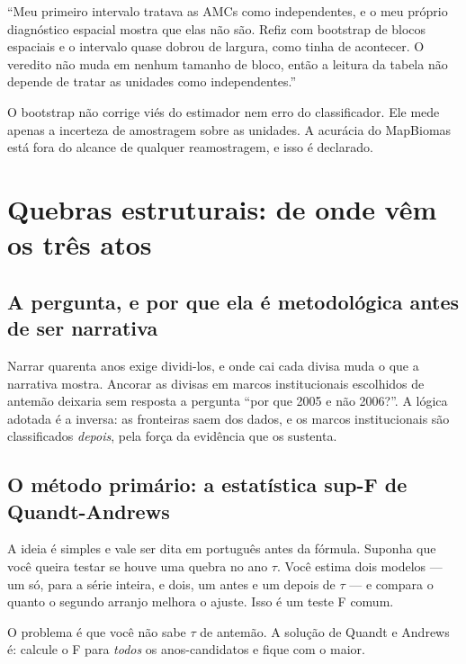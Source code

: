 \begin{nabanca}
``Meu primeiro intervalo tratava as AMCs como independentes, e o meu próprio
diagnóstico espacial mostra que elas não são. Refiz com bootstrap de blocos
espaciais e o intervalo quase dobrou de largura, como tinha de acontecer. O
veredito não muda em nenhum tamanho de bloco, então a leitura da tabela não
depende de tratar as unidades como independentes.''
\end{nabanca}

\begin{naodiz}
O bootstrap não corrige viés do estimador nem erro do classificador. Ele mede
apenas a incerteza de amostragem sobre as unidades. A acurácia do MapBiomas
está fora do alcance de qualquer reamostragem, e isso é declarado.
\end{naodiz}

\chapter{Quebras estruturais: de onde vêm os três atos}
\label{cap:quebras}

\section{A pergunta, e por que ela é metodológica antes de ser narrativa}

Narrar quarenta anos exige dividi-los, e onde cai cada divisa muda o que a
narrativa mostra. Ancorar as divisas em marcos institucionais escolhidos de
antemão deixaria sem resposta a pergunta ``por que 2005 e não 2006?''. A lógica
adotada é a inversa: as fronteiras saem dos dados, e os marcos institucionais
são classificados \emph{depois}, pela força da evidência que os sustenta.

\section{O método primário: a estatística sup-F de Quandt-Andrews}

A ideia é simples e vale ser dita em português antes da fórmula. Suponha que
você queira testar se houve uma quebra no ano $\tau$. Você estima dois modelos
--- um só, para a série inteira, e dois, um antes e um depois de $\tau$ --- e
compara o quanto o segundo arranjo melhora o ajuste. Isso é um teste F comum.

O problema é que você não sabe $\tau$ de antemão. A solução de Quandt e Andrews
é: calcule o F para \emph{todos} os anos-candidatos e fique com o maior.

